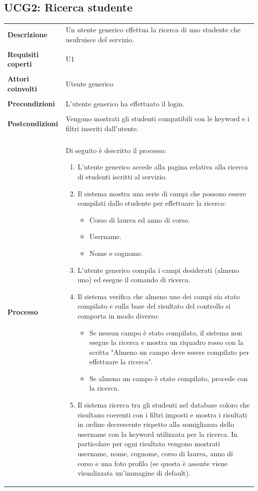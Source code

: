 \documentclass[10pt,a4paper]{report}
\begin{document}
	\subsection{UCG2: Ricerca studente}
	\begin{tabular}{lp{}}
		\textbf{Descrizione}&Un utente generico effettua la ricerca di uno studente che usufruisce del servizio.\\
		\\
		\textbf{Requisiti coperti}&U1\\
		\\
		\textbf{Attori coinvolti}&Utente generico\\
		\\
		\textbf{Precondizioni}&L'utente generico ha effettuato il login.\\
		\\
		\textbf{Postcondizioni}&Vengono mostrati gli studenti compatibili con le keyword e i filtri inseriti dall'utente.\\
		\\
		\textbf{Processo}&Di seguito è descritto il processo:
		\begin{enumerate}
			\item L'utente generico accede alla pagina relativa alla ricerca di studenti iscritti al servizio.
			\item Il sistema mostra una serie di campi che possono essere compilati dallo studente per effettuare la ricerca:
			\begin{itemize}
				\item Corso di laurea ed anno di corso.
				\item Username.
				\item Nome e cognome.			
			\end{itemize}
			\item L'utente generico compila i campi desiderati (almeno uno) ed esegue il comando di ricerca.
			\item Il sistema verifica che almeno uno dei campi sia stato compilato e sulla base del risultato del controllo si comporta in modo diverso:
			\begin{itemize}
				\item Se nessun campo è stato compilato, il sistema non esegue la ricerca e mostra un riquadro rosso con la scritta "Almeno un campo deve essere compilato per effettuare la ricerca".
				\item Se almeno un campo è stato compilato, procede con la ricerca.
			\end{itemize}
			\item Il sistema ricerca tra gli studenti nel database coloro che risultano coerenti con i filtri imposti e mostra i risultati in ordine decrescente rispetto alla somiglianza dello username con la keyword utilizzata per la ricerca. In particolare per ogni risultato vengono mostrati username, nome, cognome, corso di laurea, anno di corso e una foto profilo (se questa è assente viene visualizzata un'immagine di default).

\end{enumerate}
\end{tabular}
\end{document}
